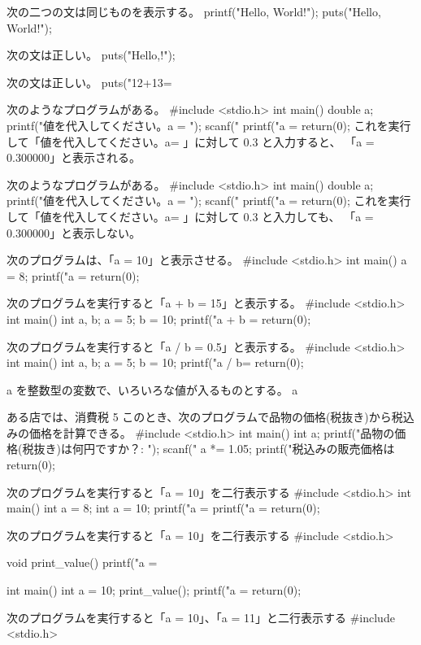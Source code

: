 次の二つの文は同じものを表示する。
printf("Hello, World!");
puts("Hello, World!");

次の文は正しい。
puts("Hello,\nWorld!");

次の文は正しい。
puts("12+13=%

次のようなプログラムがある。
#include <stdio.h>
int main()
{
  double a;
  printf("値を代入してください。a = ");
  scanf("%
  printf("a = %
  return(0);
}
これを実行して「値を代入してください。a= 」に対して 0.3 と入力すると、
「a = 0.300000」と表示される。

次のようなプログラムがある。
#include <stdio.h>
int main()
{
  double a;
  printf("値を代入してください。a = ");
  scanf("%
  printf("a = %
  return(0);
}
これを実行して「値を代入してください。a= 」に対して 0.3 と入力しても、
「a = 0.300000」と表示しない。

次のプログラムは、「a = 10」と表示させる。
#include <stdio.h>
int main()
{
  a = 8;
  printf("a = %
  return(0);
}

次のプログラムを実行すると「a + b = 15」と表示する。
#include <stdio.h>
int main()
{
  int a, b;
  a = 5;
  b = 10;
  printf("a + b = %
  return(0);
}

次のプログラムを実行すると「a / b = 0.5」と表示する。
#include <stdio.h>
int main()
{
  int a, b;
  a = 5;
  b = 10;
  printf("a / b= %
  return(0);
}

a を整数型の変数で、いろいろな値が入るものとする。
a %

ある店では、消費税 5%
このとき、次のプログラムで品物の価格(税抜き)から税込みの価格を計算できる。
#include <stdio.h>
int main()
{
  int a;
  printf("品物の価格(税抜き)は何円ですか？: ");
  scanf("%
  a *= 1.05;
  printf("税込みの販売価格は %
  return(0);
}

次のプログラムを実行すると「a = 10」を二行表示する
#include <stdio.h>
int main()
{
  int a = 8;
  {
    int a = 10;
    printf("a = %
  }
  printf("a = %
  return(0);
}

次のプログラムを実行すると「a = 10」を二行表示する
#include <stdio.h>

void print_value()
{
   printf("a = %
}

int main()
{
  int a = 10;
  print_value();
  printf("a = %
  return(0);
}

次のプログラムを実行すると「a = 10」、「a = 11」と二行表示する
#include <stdio.h>

